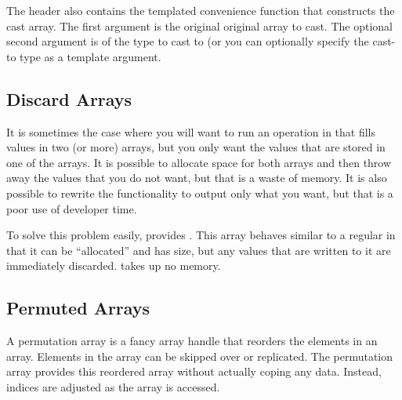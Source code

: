 
The  header also contains the
templated convenience function  that
constructs the cast array. The first argument is the original
 original array to cast. The optional second
argument is of the type to cast to (or you can optionally specify the
cast-to type as a template argument.



\subsection{Discard Arrays}
\label{sec:DiscardArrays}


It is sometimes the case where you will want to run an operation in \VTKm that fills values in two (or more) arrays, but you only want the values that are stored in one of the arrays.
It is possible to allocate space for both arrays and then throw away the values that you do not want, but that is a waste of memory.
It is also possible to rewrite the functionality to output only what you want, but that is a poor use of developer time.

To solve this problem easily, \VTKm provides .
This array behaves similar to a regular  in that it can be ``allocated'' and has size, but any values that are written to it are immediately discarded.
 takes up no memory.




\subsection{Permuted Arrays}
\label{sec:PermutedArrays}


A permutation array is a fancy array handle that reorders the elements in
an array. Elements in the array can be skipped over or replicated. The
permutation array provides this reordered array without actually coping any
data. Instead, indices are adjusted as the array is accessed.

